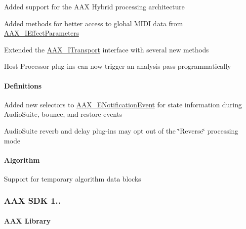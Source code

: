 \begin{DoxyItemize}
\item Added support for the A\+AX Hybrid processing architecture 
\item Added methods for better access to global M\+I\+DI data from \mbox{\hyperlink{a01825}{A\+A\+X\+\_\+\+I\+Effect\+Parameters}}  
\item Extended the \mbox{\hyperlink{a01885}{A\+A\+X\+\_\+\+I\+Transport}} interface with several new methods 
\item Host Processor plug-\/ins can now trigger an analysis pass programmatically  
\end{DoxyItemize}\hypertarget{a00847_aax_sdk_2p0p0_Definitions}{}\paragraph{Definitions}\label{a00847_aax_sdk_2p0p0_Definitions}

\begin{DoxyItemize}
\item Added new selectors to \mbox{\hyperlink{a00491_afab5ea2cfd731fc8f163b6caa685406e}{A\+A\+X\+\_\+\+E\+Notification\+Event}} for state information during Audio\+Suite, bounce, and restore events  
\item Audio\+Suite reverb and delay plug-\/ins may opt out of the \char`\"{}\+Reverse\char`\"{} processing mode 
\end{DoxyItemize}\hypertarget{a00847_aax_sdk_2p0p0_Algorithm}{}\paragraph{Algorithm}\label{a00847_aax_sdk_2p0p0_Algorithm}

\begin{DoxyItemize}
\item Support for temporary algorithm data blocks 
\end{DoxyItemize}\hypertarget{a00847_aax_sdk_1p5p0}{}\subsubsection{A\+A\+X S\+D\+K 1..}\label{a00847_aax_sdk_1p5p0}
\hypertarget{a00847_aax_sdk_1p5p0_AAXLibrary}{}\paragraph{A\+A\+X Library}\label{a00847_aax_sdk_1p5p0_AAXLibrary}

